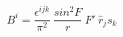 \begin{equation}
B^i= \frac{\epsilon^{ijk}}{\pi^2}~\frac{sin^2F}{r}~F'~{\hat{r}}_j s_k
\end{equation}

